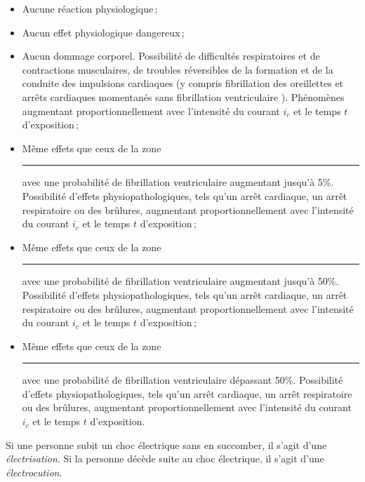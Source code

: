 \begin{mdframed}
\begin{itemize}
\item[\textcolor{YellowGreen}{\rule{1.5em}{1.2ex}}] Aucune réaction physiologique\,;
\item[\textcolor{yellow}{\rule{1.5em}{1.2ex}}] Aucun effet physiologique dangereux\,;
\item[\textcolor{yellow!75!red}{\rule{1.5em}{1.2ex}}] Aucun dommage corporel. Possibilité de difficultés respiratoires et de contractions musculaires, de troubles réversibles de la formation et de la conduite des impulsions cardiaques (y compris fibrillation des oreillettes et arrêts cardiaques momentanés sans fibrillation ventriculaire ). Phénomènes augmentant proportionnellement avec l'intensité du courant $i_c$ et le temps $t$ d'exposition\,;
\item[\textcolor{yellow!50!red}{\rule{1.5em}{1.2ex}}] Même effets que ceux de la zone \textcolor{yellow!75!red}{\rule{1.5em}{1.2ex}} avec une probabilité de fibrillation ventriculaire augmentant jusqu'à 5\%. Possibilité d'effets physiopathologiques, tels qu'un arrêt cardiaque, un arrêt respiratoire ou des brûlures, augmentant proportionnellement avec l'intensité du courant $i_c$ et le temps $t$ d'exposition\,;
\item[\textcolor{yellow!25!red}{\rule{1.5em}{1.2ex}}] Même effets que ceux de la zone \textcolor{yellow!75!red}{\rule{1.5em}{1.2ex}} avec une probabilité de fibrillation ventriculaire augmentant jusqu'à 50\%. Possibilité d'effets physiopathologiques, tels qu'un arrêt cardiaque, un arrêt respiratoire ou des brûlures, augmentant proportionnellement avec l'intensité du courant $i_c$ et le temps $t$ d'exposition\,;
\item[\textcolor{red}{\rule{1.5em}{1.2ex}}] Même effets que ceux de la zone \textcolor{yellow!75!red}{\rule{1.5em}{1.2ex}} avec une probabilité de fibrillation ventriculaire dépassant 50\%. Possibilité d'effets physiopathologiques, tels qu'un arrêt cardiaque, un arrêt respiratoire ou des brûlures, augmentant proportionnellement avec l'intensité du courant $i_c$ et le temps $t$ d'exposition.
\end{itemize}
\end{mdframed}

Si une personne subit un choc électrique sans en succomber, il s'agit d'une \emph{électrisation}. Si la personne décède suite au choc électrique, il s'agit d'une \emph{électrocution}.

